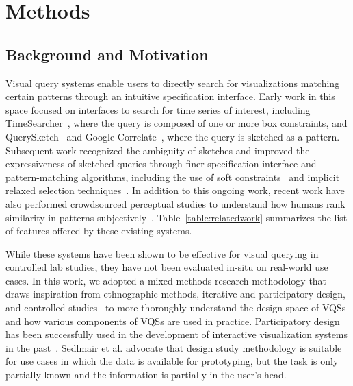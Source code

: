 \section{Methods\label{sec:methods}}
\subsection{Background and Motivation}
\par Visual query systems enable users to directly search for visualizations matching certain patterns through an intuitive specification interface. Early work in this space focused on interfaces to search for time series of interest, including TimeSearcher~\cite{Hochheiser2001,Hochheiser2004}, where the query is composed of one or more box constraints, and QuerySketch~\cite{wattenberg2001sketching} and Google Correlate~\cite{mohebbi2011google}, where the query is sketched as a pattern. Subsequent work recognized the ambiguity of sketches and improved the expressiveness of sketched queries through finer specification interface and pattern-matching algorithms, including the use of soft constraints~\cite{ryall2005querylines} and implicit relaxed selection techniques~\cite{Holz2009}. In addition to this ongoing work, recent work have also performed crowdsourced perceptual studies to understand how humans rank similarity in patterns subjectively~\cite{Eichmann2015,correll2016semantics,Mannino2018}. Table~\ref{table:relatedwork} summarizes the list of features offered by these existing systems.

\par While these systems have been shown to be effective for visual querying in controlled lab studies, they have not been evaluated in-situ on real-world use cases. In this work, we adopted a mixed methods research methodology that draws inspiration from ethnographic methods, iterative and participatory design, and controlled studies~\cite{Plaisant2004,lam2012empirical,miller_salkind_miller_2002,shneiderman2006strategies,Muller1993} to more thoroughly understand the design space of VQSs and how various components of VQSs are used in practice. Participatory design has been successfully used in the development of interactive visualization systems in the past~\cite{Aragon2008,Chuang2012}. Sedlmair et al. \cite{Sedlmair2012} advocate that design study methodology is suitable for use cases in which the data is available for prototyping, but the task is only partially known and the information is partially in the user's head. %
